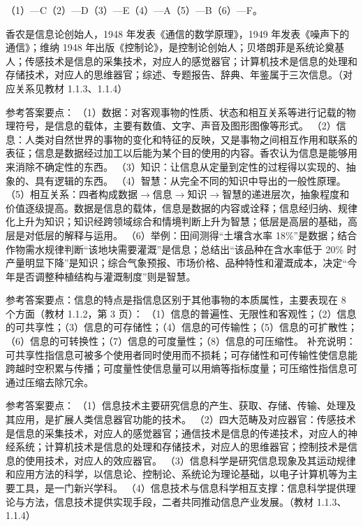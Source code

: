 \documentclass[a4paper,11pt]{article}
\begin{document}

\q （1）—C\quad （2）—D\quad （3）—E\quad （4）—A\quad （5）—B\quad （6）—F。
\begin{analysis}香农是信息论创始人，1948 年发表《通信的数学原理》，1949 年发表《噪声下的通信》；维纳 1948 年出版《控制论》，是控制论创始人；贝塔朗菲是系统论奠基人；传感技术是信息的采集技术，对应人的感觉器官；计算机技术是信息的处理和存储技术，对应人的思维器官；综述、专题报告、辞典、年鉴属于三次信息。（对应关系见教材 1.1.3、1.1.4）\end{analysis}


\q 参考答案要点：
（1）数据：对客观事物的性质、状态和相互关系等进行记载的物理符号，是信息的载体，主要有数值、文字、声音及图形图像等形式。
（2）信息：人类对自然世界的事物的变化和特征的反映，又是事物之间相互作用和联系的表征；信息是数据经过加工以后能为某个目的使用的内容。香农认为信息是能够用来消除不确定性的东西。
（3）知识：让信息从定量到定性的过程得以实现的、抽象的、具有逻辑的东西。
（4）智慧：从完全不同的知识中导出的一般性原理。
（5）相互关系：四者构成数据$\rightarrow$信息$\rightarrow$知识$\rightarrow$智慧的递进层次，抽象程度和价值逐级提高。数据是信息的载体，信息是数据的内容或诠释；信息经归纳、规律化上升为知识；知识经跨领域综合和情境判断上升为智慧；低层是高层的基础，高层是对低层的解释与运用。
（6）举例：田间测得“土壤含水率 18\%”是数据；结合作物需水规律判断“该地块需要灌溉”是信息；总结出“该品种在含水率低于 20\% 时产量明显下降”是知识；综合气象预报、市场价格、品种特性和灌溉成本，决定“今年是否调整种植结构与灌溉制度”则是智慧。

\q 参考答案要点：信息的特点是指信息区别于其他事物的本质属性，主要表现在 8 个方面（教材 1.1.2，第 3 页）：
（1）信息的普遍性、无限性和客观性；（2）信息的可共享性；（3）信息的可存储性；（4）信息的可传输性；（5）信息的可扩散性；（6）信息的可转换性；（7）信息的可度量性；（8）信息的可压缩性。
补充说明：可共享性指信息可被多个使用者同时使用而不损耗；可存储性和可传输性使信息能跨越时空积累与传播；可度量性使信息量可以用熵等指标度量；可压缩性指信息可通过压缩去除冗余。

\q 参考答案要点：
（1）信息技术主要研究信息的产生、获取、存储、传输、处理及其应用，是扩展人类信息器官功能的技术。
（2）四大范畴及对应器官：传感技术是信息的采集技术，对应人的感觉器官；通信技术是信息的传递技术，对应人的神经系统；计算机技术是信息的处理和存储技术，对应人的思维器官；控制技术是信息的使用技术，对应人的效应器官。
（3）信息科学是研究信息现象及其运动规律和应用方法的科学，以信息论、控制论、系统论为理论基础，以电子计算机等为主要工具，是一门新兴学科。
（4）信息技术与信息科学相互支撑：信息科学提供理论与方法，信息技术提供实现手段，二者共同推动信息产业发展。（教材 1.1.3、1.1.4）
\end{document}
